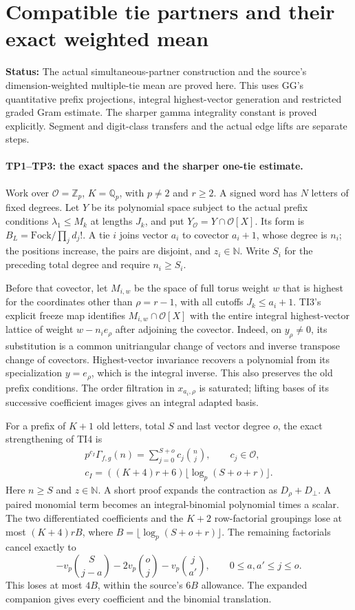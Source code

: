 \documentclass[11pt,a4paper]{article}
\numberwithin{equation}{section}
\theoremstyle{remark}\newtheorem{remark}[theorem]{Remark}
\newcommand{\status}[1]{\textbf{Status:} #1}
\begin{document}
\section{Compatible tie partners and their exact weighted mean}
\label{sec:tie-partners}

\status{The actual simultaneous-partner construction and the source's
dimension-weighted multiple-tie mean are proved here. This uses GG's
quantitative prefix projections, integral highest-vector generation and
restricted graded Gram estimate. The sharper gamma integrality constant
is proved explicitly. Segment and digit-class transfers and the actual
edge lifts are separate steps.}

\paragraph{TP1--TP3: the exact spaces and the sharper one-tie estimate.}
Work over $\mathcal O=\mathbb Z_p$, $K=\mathbb Q_p$, with $p\ne2$ and
$r\ge2$. A signed word has $N$ letters of fixed degrees. Let $Y$ be its
polynomial space subject to the actual prefix conditions
$\lambda_1\le M_k$ at lengths $J_k$, and put
$Y_{\mathcal O}=Y\cap\mathcal O[X]$. Its form is
$B_L=\mathrm{Fock}/\prod_jd_j!$.
A tie $i$ joins vector $a_i$ to covector $a_i+1$, whose degree is $n_i$;
the positions increase, the pairs are disjoint, and $z_i\in\mathbb N$.
Write $S_i$ for the preceding total degree and require $n_i\ge S_i$.

Before that covector, let $M_{i,w}$ be the space of full torus weight $w$
that is highest for the coordinates other than $\rho=r-1$, with all
cutoffs $J_k\le a_i+1$. TI3's explicit freeze map identifies
$M_{i,w}\cap\mathcal O[X]$ with the entire integral highest-vector lattice
of weight $w-n_i e_\rho$ after adjoining the covector. Indeed, on
$y_\rho\ne0$, its substitution is a common unitriangular change of vectors
and inverse transpose change of covectors. Highest-vector invariance
recovers a polynomial from its specialization $y=e_\rho$, which is the
integral inverse. This also preserves the old prefix conditions.
The order filtration in $x_{a_i,\rho}$ is saturated; lifting bases of its
successive coefficient images gives an integral adapted basis.

For a prefix of $K+1$ old letters, total $S$ and last vector degree $o$,
the exact strengthening of TI4 is
\[
 \begin{gathered}
 p^{c_I}\Gamma_{f,g}(n)=\sum_{j=0}^{S+o}c_j\binom nj,
 \qquad c_j\in\mathcal O,\\
 c_I=((K+4)r+6)\lfloor\log_p(S+o+r)\rfloor.
 \end{gathered}
 \tag{TP.1}
\]
Here $n\ge S$ and $z\in\mathbb N$. A short proof expands the contraction
as $D_\rho+D_\perp$. A paired monomial term becomes an integral-binomial
polynomial times a scalar. The two differentiated coefficients and the
$K+2$ row-factorial groupings lose at most $(K+4)rB$, where
$B=\lfloor\log_p(S+o+r)\rfloor$. The remaining factorials cancel exactly to
\[
 -v_p\binom S{j-a}-2v_p\binom oj-v_p\binom j{a'},
 \qquad 0\le a,a'\le j\le o.
\]
This loses at most $4B$, within the source's $6B$ allowance. The expanded
companion gives every coefficient and the binomial translation.
\end{document}
